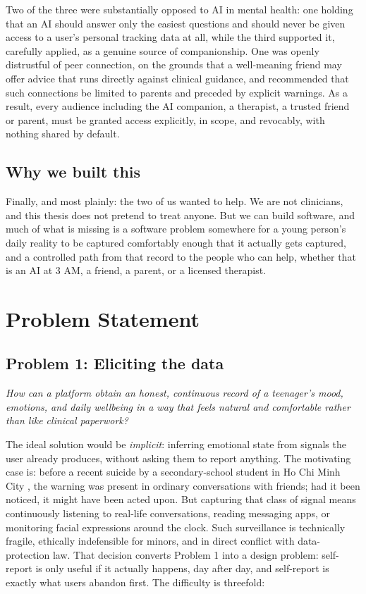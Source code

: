  Two of the three were
substantially opposed to AI in mental health: one holding that an AI should
answer only the easiest questions and should never be given access to a user's
personal tracking data at all, while the third supported it, carefully
applied, as a genuine source of companionship. One was openly distrustful of
peer connection, on the grounds that a well-meaning friend may offer advice that
runs directly against clinical guidance, and recommended that such connections
be limited to parents and preceded by explicit warnings. As a result, every audience including the AI companion, a
therapist, a trusted friend or parent, must be granted access explicitly, in
scope, and revocably, with nothing shared by default.

\subsection*{Why we built this}

Finally, and most plainly: the two of us wanted to help. We are not clinicians,
and this thesis does not pretend to treat anyone. But we can build software, and
much of what is missing is a software problem somewhere for a young person's
daily reality to be captured comfortably enough that it actually gets captured,
and a controlled path from that record to the people who can help, whether that
is an AI at 3 AM, a friend, a parent, or a licensed therapist.


\section{Problem Statement}
\label{sec:problems}


\subsection*{Problem 1: Eliciting the data}

\textit{How can a platform obtain an honest, continuous record of a teenager's mood,
emotions, and daily wellbeing in a way that feels natural and comfortable rather than
like clinical paperwork?}

The ideal solution would be \textit{implicit}: inferring emotional state from signals the
user already produces, without asking them to report anything. The motivating case is: before a recent suicide by a secondary-school student in Ho Chi Minh City \cite{DanTri2017}, the
warning was present in ordinary conversations with friends; had it been noticed, it might
have been acted upon. But capturing that class of signal means continuously listening to
real-life conversations, reading messaging apps, or monitoring facial expressions around
the clock. Such surveillance is technically fragile, ethically indefensible for minors,
and in direct conflict with data-protection law.
That decision converts Problem 1 into a design problem: self-report is only useful if it
actually happens, day after day, and self-report is exactly what users abandon first.
The difficulty is threefold:

